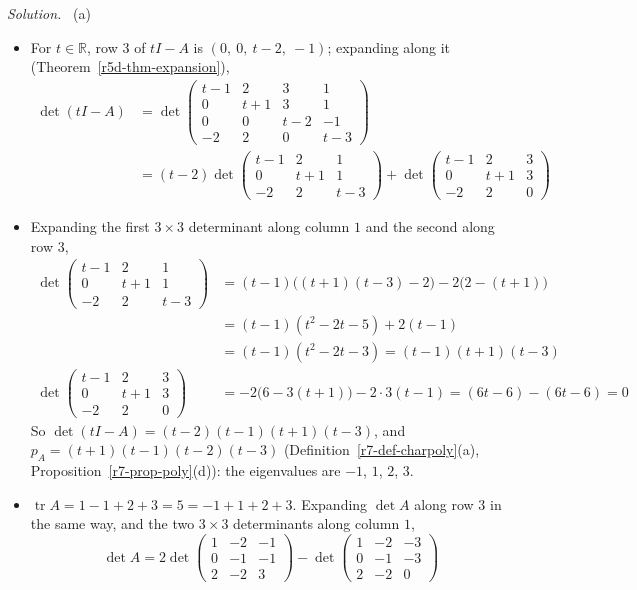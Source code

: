 \documentclass[12pt]{article}
\newcommand{\R}{\mathbb R}
\DeclareMathOperator{\tr}{tr}
\theoremstyle{definition}
\newenvironment{solution}{\par\noindent\textit{Solution.}\ }{\par\smallskip}
\begin{document}
\begin{solution}
(a)
\begin{itemize}
\item For \(t\in\R\), row \(3\) of \(tI-A\) is \((0,\ 0,\ t-2,\ -1)\); expanding along it (Theorem~\ref{r5d-thm-expansion}),
\[
\begin{aligned}
\det(tI-A)&=\det\begin{pmatrix}t-1&2&3&1\\0&t+1&3&1\\0&0&t-2&-1\\-2&2&0&t-3\end{pmatrix}\\
&=(t-2)\det\begin{pmatrix}t-1&2&1\\0&t+1&1\\-2&2&t-3\end{pmatrix}+\det\begin{pmatrix}t-1&2&3\\0&t+1&3\\-2&2&0\end{pmatrix}
\end{aligned}
\]
\item Expanding the first \(3\times3\) determinant along column \(1\) and the second along row \(3\),
\[
\begin{aligned}
\det\begin{pmatrix}t-1&2&1\\0&t+1&1\\-2&2&t-3\end{pmatrix}&=(t-1)\bigl((t+1)(t-3)-2\bigr)-2\bigl(2-(t+1)\bigr)\\
&=(t-1)(t^2-2t-5)+2(t-1)\\
&=(t-1)(t^2-2t-3)=(t-1)(t+1)(t-3)\\
\det\begin{pmatrix}t-1&2&3\\0&t+1&3\\-2&2&0\end{pmatrix}&=-2\bigl(6-3(t+1)\bigr)-2\cdot3(t-1)=(6t-6)-(6t-6)=0
\end{aligned}
\]
So \(\det(tI-A)=(t-2)(t-1)(t+1)(t-3)\), and \(p_A=(t+1)(t-1)(t-2)(t-3)\) (Definition~\ref{r7-def-charpoly}(a),
Proposition~\ref{r7-prop-poly}(d)): the eigenvalues are \(-1\), \(1\), \(2\), \(3\).
\item \(\tr A=1-1+2+3=5=-1+1+2+3\). Expanding \(\det A\) along row \(3\) in the same way, and the two \(3\times3\)
determinants along column \(1\),
\[
\det A=2\det\begin{pmatrix}1&-2&-1\\0&-1&-1\\2&-2&3\end{pmatrix}-\det\begin{pmatrix}1&-2&-3\\0&-1&-3\\2&-2&0\end{pmatrix}
\]
\end{itemize}
\end{solution}
\end{document}
